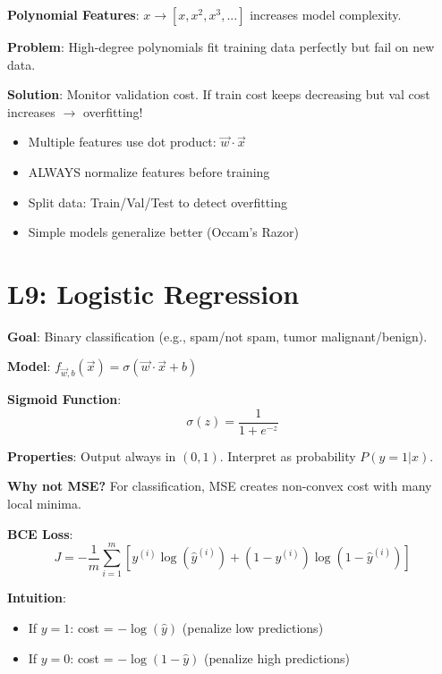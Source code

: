 \documentclass[11pt,a4paper]{article}
\begin{document}
\begin{examplebox}

\textbf{Polynomial Features}: $x \to [x, x^2, x^3, ...]$ increases model complexity.

\textbf{Problem}: High-degree polynomials fit training data perfectly but fail on new data.

\textbf{Solution}: Monitor validation cost. If train cost keeps decreasing but val cost increases $\to$ overfitting!
\end{examplebox}

\begin{notebox}

\begin{itemize}[leftmargin=*,nosep]
\item Multiple features use dot product: $\vec{w} \cdot \vec{x}$
\item ALWAYS normalize features before training
\item Split data: Train/Val/Test to detect overfitting
\item Simple models generalize better (Occam's Razor)
\end{itemize}
\end{notebox}

\section{L9: Logistic Regression}

\begin{definitionbox}

\textbf{Goal}: Binary classification (e.g., spam/not spam, tumor malignant/benign).

\textbf{Model}: $f_{\vec{w},b}(\vec{x}) = \sigma(\vec{w} \cdot \vec{x} + b)$

\textbf{Sigmoid Function}:
\[\sigma(z) = \frac{1}{1 + e^{-z}}\]

\textbf{Properties}: Output always in $(0, 1)$. Interpret as probability $P(y=1|x)$.
\end{definitionbox}

\begin{warningbox}

\textbf{Why not MSE?} For classification, MSE creates non-convex cost with many local minima.

\textbf{BCE Loss}:
\[J = -\frac{1}{m}\sum_{i=1}^{m}[y^{(i)}\log(\hat{y}^{(i)}) + (1-y^{(i)})\log(1-\hat{y}^{(i)})]\]

\textbf{Intuition}:
\begin{itemize}[leftmargin=*,nosep]
\item If $y=1$: cost = $-\log(\hat{y})$ (penalize low predictions)
\item If $y=0$: cost = $-\log(1-\hat{y})$ (penalize high predictions)
\end{itemize}
\end{warningbox}
\end{document}
